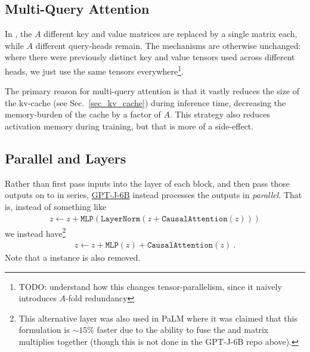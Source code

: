 \documentclass[11pt]{article}
\begin{document}
\subsection{Multi-Query Attention \label{subsec_multi_query_attn}}

In \cite{shazeer2019fast}, the $ A $ different key and value matrices are replaced by a single
matrix each, while $ A$ different query-heads remain. The mechanisms are otherwise unchanged: where
there were previously distinct key and value tensors used across different heads, we just use the same
tensors everywhere\footnote{TODO: understand how this changes tensor-parallelism, since it naively
introduces $ A $-fold redundancy}.


The primary reason for multi-query attention is that it vastly reduces the size of the kv-cache (see
Sec.~\ref{sec_kv_cache}) during inference time, decreasing the memory-burden of the cache by a
factor of $ A $. This strategy also reduces activation memory during training, but that is more of a
side-effect.


\subsection{Parallel  and  Layers}

Rather than first pass inputs into the  layer of each block, and then pass
those outputs on to  in series, \href{https://github.com/kingoflolz/mesh-transformer-jax/blob/f8315e3003033b23f21d78361b288953064e0e76/mesh_transformer/layers.py#L303}{GPT-J-6B}
instead processes the  outputs in \textit{parallel}. That is, instead of something
like
\begin{align}
    z \leftarrow z + \texttt{MLP}\left ( \texttt{LayerNorm}\left ( z + \texttt{CausalAttention}\left ( z \right ) \right ) \right )
\end{align}
we instead have\footnote{This alternative layer was also used in PaLM \cite{chowdhery2022palm} where it
was claimed that this formulation is $\sim 15\%$ faster due to the ability to fuse the 
and  matrix multiplies together (though this is not done in the GPT-J-6B repo above).}
\begin{align}
z \leftarrow z + \texttt{MLP}\left ( z \right )    + \texttt{CausalAttention}\left ( z \right )\ .
\end{align}
Note that a  instance is also removed.
\end{document}
